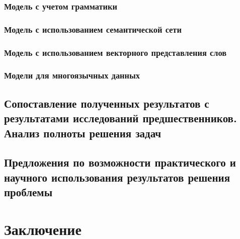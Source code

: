\documentclass[a4paper,14pt,oneside,openany]{memoir}
\begin{document}
\subsection{Модель с учетом грамматики}

\subsection{Модель с использованием семантической сети}

\subsection{Модель с использованием векторного представления слов}

\subsection{Модели для многоязычных данных}

\section{Сопоставление полученных результатов с результатами исследований предшественников.
Анализ полноты решения задач}

\section{Предложения по возможности практического и научного использования результатов решения проблемы}

\chapter*{Заключение}

\printbibliography[title={Список использованных источников},category=cited]
\printbibliography[title={Непроцитированные источники (должно быть пусто)},notcategory=cited]
\end{document}
